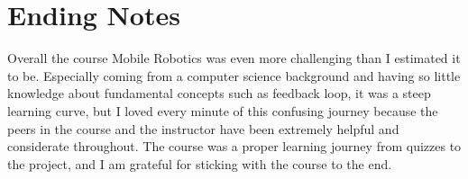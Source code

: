 \documentclass[12pt]{article}
\begin{document}
\section{Ending Notes}
Overall the course Mobile Robotics was even more challenging than I estimated it to be. Especially coming from a computer science background and having so little knowledge about fundamental concepts such as feedback loop, it was a steep learning curve, but I loved every minute of this confusing journey because the peers in the course and the instructor have been extremely helpful and considerate throughout. The course was a proper learning journey from quizzes to the project, and I am grateful for sticking with the course to the end. 
\end{document}

